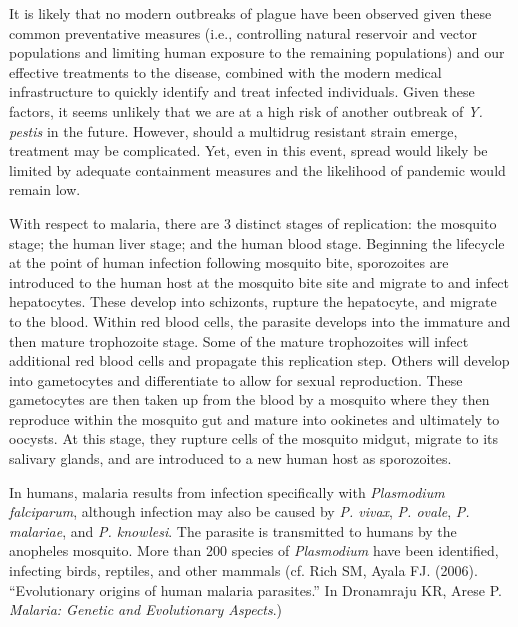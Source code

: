 \documentclass[11pt,letterpaper,final] {article}
\begin{document}
It is likely that no modern outbreaks of plague have been observed given these common preventative measures (i.e., controlling natural reservoir and vector populations and limiting human exposure to the remaining populations) and our effective treatments to the disease, combined with the modern medical infrastructure to quickly identify and treat infected individuals. Given these factors, it seems unlikely that we are at a high risk of another outbreak of \textit{Y. pestis} in the future. However, should a multidrug resistant strain emerge, treatment may be complicated. Yet, even in this event, spread would likely be limited by adequate containment measures and the likelihood of pandemic would remain low.

With respect to malaria, there are 3 distinct stages of replication: the mosquito stage; the human liver stage; and the human blood stage. Beginning the lifecycle at the point of human infection following mosquito bite, sporozoites are introduced to the human host at the mosquito bite site and migrate to and infect hepatocytes. These develop into schizonts, rupture the hepatocyte, and migrate to the blood. Within red blood cells, the parasite develops into the immature and then mature trophozoite stage. Some of the mature trophozoites will infect additional red blood cells and propagate this replication step. Others will develop into gametocytes and differentiate to allow for sexual reproduction. These gametocytes are then taken up from the blood by a mosquito where they then reproduce within the mosquito gut and mature into ookinetes and ultimately to oocysts. At this stage, they rupture cells of the mosquito midgut, migrate to its salivary glands, and are introduced to a new human host as sporozoites.

In humans, malaria results from infection specifically with \textit{Plasmodium falciparum}, although infection may also be caused by \textit{P. vivax}, \textit{P. ovale}, \textit{P. malariae}, and \textit{P. knowlesi}. The parasite is transmitted to humans by the anopheles mosquito. More than 200 species of \textit{Plasmodium} have been identified, infecting birds, reptiles, and other mammals (cf. Rich SM, Ayala FJ. (2006). ``Evolutionary origins of human malaria parasites.'' In Dronamraju KR, Arese P. \textit{Malaria: Genetic and Evolutionary Aspects}.)
\end{document}
